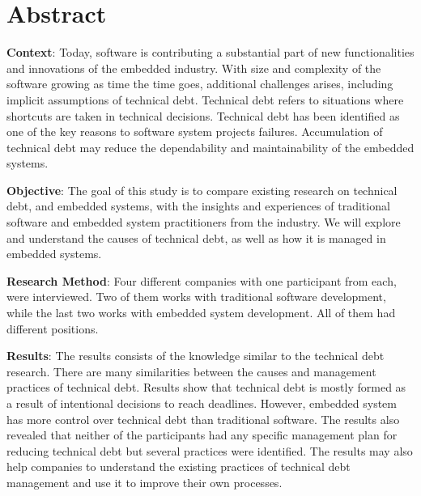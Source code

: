 

\section*{Abstract}
\textbf{Context}: Today, software is contributing a substantial part of new functionalities and innovations of the embedded industry. With size and complexity of the software growing as time the time goes, additional challenges arises, including implicit assumptions of technical debt. Technical debt refers to situations where shortcuts are taken in technical decisions. Technical debt has been identified as one of the key reasons to software system projects failures. Accumulation of technical debt may reduce the dependability and maintainability of the embedded systems.

\textbf{Objective}: The goal of this study is to compare existing research on technical debt, and embedded systems, with the insights and experiences of traditional software and embedded system practitioners from the industry. We will explore and understand the causes of technical debt, as well as how it is managed in embedded systems.  

\textbf{Research Method}: Four different companies with one participant from each, were interviewed. Two of them works with traditional software development, while the last two works with embedded system development. All of them had different positions.

\textbf{Results}: The results consists of the knowledge similar to the technical debt research. There are many similarities between the causes and management practices of technical debt. Results show that technical debt is mostly formed as a result of intentional decisions to reach deadlines. However, embedded system has more control over technical debt than traditional software. The results also revealed that neither of the participants had any specific management plan for reducing technical debt but several practices were identified. The results may also help companies to understand the existing practices of technical debt management and use it to improve their own processes.